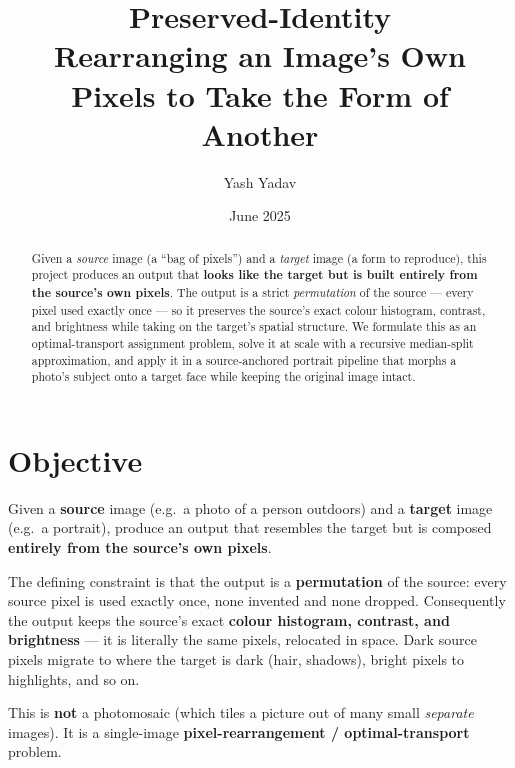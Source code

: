 \documentclass[11pt,a4paper]{article}
\title{\textbf{Preserved-Identity}\\[4pt]
\large Rearranging an Image's Own Pixels to Take the Form of Another}
\author{Yash Yadav}
\date{June 2025}
\begin{document}
\maketitle

\begin{abstract}
\noindent
Given a \emph{source} image (a ``bag of pixels'') and a \emph{target} image (a form to
reproduce), this project produces an output that \textbf{looks like the target but is built
entirely from the source's own pixels}. The output is a strict \emph{permutation} of the
source --- every pixel used exactly once --- so it preserves the source's exact colour
histogram, contrast, and brightness while taking on the target's spatial structure. We
formulate this as an optimal-transport assignment problem, solve it at scale with a recursive
median-split approximation, and apply it in a source-anchored portrait pipeline that morphs a
photo's subject onto a target face while keeping the original image intact.
\end{abstract}

\section{Objective}
Given a \textbf{source} image (e.g.\ a photo of a person outdoors) and a \textbf{target}
image (e.g.\ a portrait), produce an output that resembles the target but is composed
\textbf{entirely from the source's own pixels}.

The defining constraint is that the output is a \textbf{permutation} of the source: every
source pixel is used exactly once, none invented and none dropped. Consequently the output
keeps the source's exact \textbf{colour histogram, contrast, and brightness} --- it is
literally the same pixels, relocated in space. Dark source pixels migrate to where the target
is dark (hair, shadows), bright pixels to highlights, and so on.

This is \textbf{not} a photomosaic (which tiles a picture out of many small \emph{separate}
images). It is a single-image \textbf{pixel-rearrangement / optimal-transport} problem.

\end{document}
